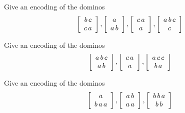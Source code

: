 \documentclass[11pt]{article}
\begin{document}
\begin{task}
  Give an encoding of the dominos
  \[
    \domino{b\,c}{c\,a}, \domino{a}{a\,b}, \domino{c\,a}{a}, \domino{a\,b\,c}{c}
  \]
\end{task}

\begin{task}
  Give an encoding of the dominos
  \[
    \domino{a\,b\,c}{a\,b}, \domino{c\,a}{a}, \domino{a\,c\,c}{b\,a}
  \]
\end{task}

\begin{task}
  Give an encoding of the dominos
  \[
    \domino{a}{b\,a\,a}, \domino{a\,b}{a\,a}, \domino{b\,b\,a}{b\,b}
  \]
\end{task}




\end{document}
